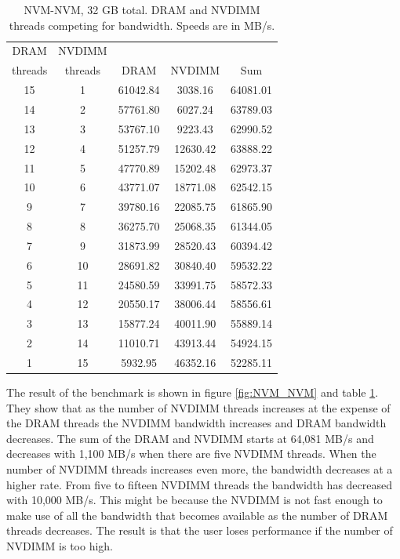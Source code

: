 \documentclass[12pt,a4paper,USenglish]{article}      %
\begin{document}
\begin{table}[!hbtp]
\centering
\begin{tabular}{ |c|c|c|c|c| } 
\hline
DRAM & NVDIMM &  & & \\
threads & threads & DRAM & NVDIMM & Sum \\
\hline
15 & 1 & 61042.84 & 3038.16 & 64081.01 \\
\hline
14 & 2 & 57761.80 & 6027.24 & 63789.03 \\
\hline
13 & 3 & 53767.10 & 9223.43 & 62990.52 \\
\hline
12 & 4 & 51257.79 & 12630.42 & 63888.22 \\
\hline
11 & 5 & 47770.89 & 15202.48 & 62973.37 \\
\hline
10 & 6 & 43771.07 & 18771.08 & 62542.15 \\
\hline
9 & 7 & 39780.16 & 22085.75 & 61865.90 \\
\hline
8 & 8 & 36275.70 & 25068.35 & 61344.05 \\
\hline
7 & 9 & 31873.99 & 28520.43 & 60394.42 \\
\hline
6 & 10 & 28691.82 & 30840.40 & 59532.22 \\
\hline
5 & 11 & 24580.59 & 33991.75 & 58572.33 \\
\hline
4 & 12 & 20550.17 & 38006.44 & 58556.61 \\
\hline
3 & 13 & 15877.24 & 40011.90 & 55889.14 \\
\hline
2 & 14 & 11010.71 & 43913.44 & 54924.15 \\
\hline
1 & 15 & 5932.95 & 46352.16 & 52285.11 \\
\hline
\end{tabular}
\caption{NVM-NVM, 32 GB total. DRAM and NVDIMM threads competing for bandwidth. Speeds are in MB/s.}
\label{tab:NVM_NVM}
\end{table}

The result of the benchmark is shown in figure \ref{fig:NVM_NVM} and table \ref{tab:NVM_NVM}. They show that as the number of NVDIMM threads increases at the expense of the DRAM threads the NVDIMM bandwidth increases and DRAM bandwidth decreases. 
The sum of the DRAM and NVDIMM starts at 64,081 MB/s and decreases with 1,100 MB/s when there are five NVDIMM threads. When the number of NVDIMM threads increases even more, the bandwidth decreases at a  higher rate. From five to fifteen NVDIMM threads the bandwidth has decreased with 10,000 MB/s. This might be because the NVDIMM is not fast enough to make use of all the bandwidth that becomes available as the number of DRAM threads decreases. The result is that the user loses performance if the number of NVDIMM is too high.
\end{document}
